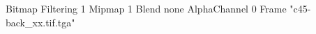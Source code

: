 {Bitmap
	{Filtering 1}
	{Mipmap 1}
	{Blend none}
	{AlphaChannel 0}
	{Frame "c45-back_xx.tif.tga"}
}

